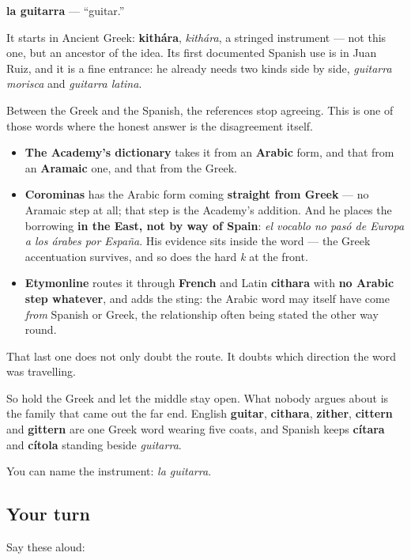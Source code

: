 \begin{cousinweb}
\textbf{la guitarra} — \textquotedblleft{}guitar.\textquotedblright{}

It starts in Ancient Greek: \textbf{kithára}, \emph{kithára}, a stringed instrument — not this one, but an ancestor of the idea. Its first documented Spanish use is in Juan Ruiz, and it is a fine entrance: he already needs two kinds side by side, \emph{guitarra morisca} and \emph{guitarra latina}.

Between the Greek and the Spanish, the references stop agreeing. This is one of those words where the honest answer is the disagreement itself.

\begin{itemize}
\raggedright
  \item \textbf{The Academy's dictionary} takes it from an \textbf{Arabic} form, and that from an \textbf{Aramaic} one, and that from the Greek.
  \item \textbf{Corominas} has the Arabic form coming \textbf{straight from Greek} — no Aramaic step at all; that step is the Academy's addition. And he places the borrowing \textbf{in the East, not by way of Spain}: \emph{el vocablo no pasó de Europa a los árabes por España}. His evidence sits inside the word — the Greek accentuation survives, and so does the hard \emph{k} at the front.
  \item \textbf{Etymonline} routes it through \textbf{French} and Latin \textbf{cithara} with \textbf{no Arabic step whatever}, and adds the sting: the Arabic word may itself have come \emph{from} Spanish or Greek, the relationship often being stated the other way round.
\end{itemize}

That last one does not only doubt the route. It doubts which direction the word was travelling.

So hold the Greek and let the middle stay open. What nobody argues about is the family that came out the far end. English \textbf{guitar}, \textbf{cithara}, \textbf{zither}, \textbf{cittern} and \textbf{gittern} are one Greek word wearing five coats, and Spanish keeps \textbf{cítara} and \textbf{cítola} standing beside \emph{guitarra}.
\end{cousinweb}

\begin{grammarlens}[title={What you've built}]
You can name the instrument: \emph{la guitarra}.
\end{grammarlens}

\subsection*{Your turn}
Say these aloud:

